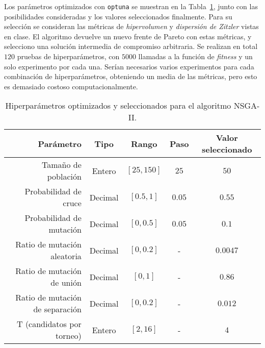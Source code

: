 Los parámetros optimizados con \lstinline{optuna} se muestran en la
Tabla~\ref{tab:ej2-params}, junto con las posibilidades consideradas y los
valores seleccionados finalmente. Para su selección se consideran las métricas
de \emph{hipervolumen} y \emph{dispersión de Zitzler} vistas en clase. El
algoritmo devuelve un nuevo frente de Pareto con estas métricas, y selecciono
una solución intermedia de compromiso arbitraria. Se realizan en total \(120\)
pruebas de hiperparámetros, con \(5000\) llamadas a la función de
\emph{fitness} y un solo experimento por cada una. Serían necesarios varios
experimentos para cada combinación de hiperparámetros, obteniendo un media de
las métricas, pero esto es demasiado costoso computacionalmente.

\begin{table}[!htbp]
\centering
\begin{tabular}{|r||cccc|}
\hline
Parámetro                       & Tipo    & Rango         & Paso & Valor seleccionado \\\hline
Tamaño de población             & Entero  & $[25, 150]$ & $25$   & $50$                 \\
Probabilidad de cruce           & Decimal & $[0.5, 1]$  & $0.05$ & $0.55$               \\
Probabilidad de mutación        & Decimal & $[0, 0.5]$  & $0.05$ & $0.1$                \\
Ratio de mutación aleatoria     & Decimal & $[0, 0.2]$  & -    & $0.0047$             \\
Ratio de mutación de unión      & Decimal & $[0, 1]$    & -    & $0.86$               \\
Ratio de mutación de separación & Decimal & $[0, 0.2]$  & -    & $0.012$              \\
T (candidatos por torneo)       & Entero  & $[2, 16]$   & -    & $4$                  \\\hline
\end{tabular}
\caption{Hiperparámetros optimizados y seleccionados para el algoritmo NSGA-II.}
\label{tab:ej2-params}
\end{table}


